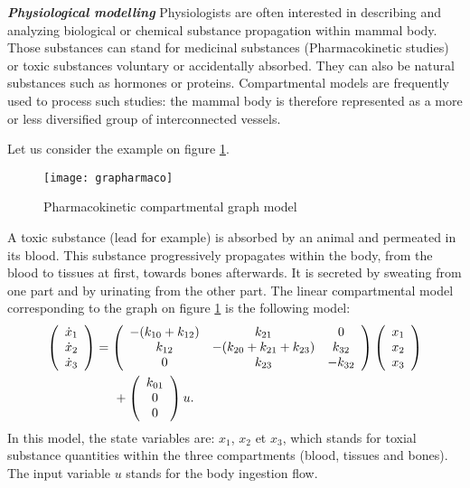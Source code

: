 \begin{exemple}{\bf \em Physiological modelling}
Physiologists are often interested in describing and analyzing biological or chemical substance propagation within mammal body.
Those substances can stand for medicinal substances (Pharmacokinetic studies) or toxic substances voluntary or accidentally absorbed.
They can also be natural substances such as hormones or proteins.
Compartmental models are frequently used to process such studies: 
the mammal body is therefore represented as a more or less diversified group of interconnected vessels.

Let us consider the example on figure \ref{Fig:grapharmaco}.
\begin{figure}[ht] 
\begin{center}
\texttt{[image: grapharmaco]}
\caption{Pharmacokinetic compartmental graph model}
\label{Fig:grapharmaco}
\end{center} 
\end{figure}

A toxic substance (lead for example) is absorbed by an animal and permeated in its blood.
This substance progressively propagates within the body, from the blood to tissues at first, towards bones afterwards.
It is secreted by sweating from one part and by urinating from the other part.
The linear compartmental model corresponding to the graph on figure \ref{Fig:grapharmaco} is the following model:
\begin{equation*} \begin{split}
\bma{c} \dot x_1 \\ \dot x_2 \\ \dot x_3 \ema &= 
\bma{ccc} -(k_{10} + k_{12}) & k_{21} & 0 \\ 
k_{12} & -(k_{20} + k_{21} + k_{23}) & k_{32} \\ 0 & k_{23} & - k_{32} \ema
\bma{c} x_1 \\ x_2 \\ x_3 \ema \\
& \hd + \bma{c} k_{ 01}\\ 0 \\ 0 \ema u.
\end{split} \end{equation*}
In this model, the state variables are: $x_1$, $x_2$ et $x_3$, which stands for toxial substance quantities within the three compartments (blood, tissues and bones).
The input variable $u$ stands for the body ingestion flow.
\cqfd
\end{exemple}


